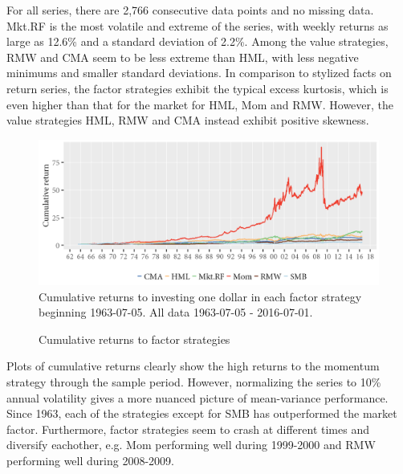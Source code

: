 For all series, there are 2,766 consecutive data points and no missing data. Mkt.RF is the most volatile and extreme of the series, with weekly returns as large as 12.6\% and a standard deviation of 2.2\%. Among the value strategies, RMW and CMA seem to be less extreme than HML, with less negative minimums and smaller standard deviations. In comparison to stylized facts on return series, the factor strategies exhibit the typical excess kurtosis, which is even higher than that for the market for HML, Mom and RMW. However, the value strategies HML, RMW and CMA instead exhibit positive skewness. 
\begin{figure}[H]
  \caption{Cumulative returns to factor strategies}
  \label{diag:cumret}
  \toprule
  \centering
  \begin{minipage}{\textwidth}
  \includegraphics[scale=1]{graphics/cumretPlot.png}  
  \bottomrule
  \vspace{3mm}
  \footnotesize
  Cumulative returns to investing one dollar in each factor strategy beginning 1963-07-05.  All data 1963-07-05 - 2016-07-01.
  \end{minipage}
\end{figure}
Plots of cumulative returns clearly show the high returns to the momentum strategy through the sample period. However, normalizing the series to 10\% annual volatility gives a more nuanced picture of mean-variance performance. Since 1963, each of the strategies except for SMB has outperformed the market factor. Furthermore, factor strategies seem to crash at different times and diversify eachother, e.g. Mom performing well during 1999-2000 and RMW performing well during 2008-2009.
